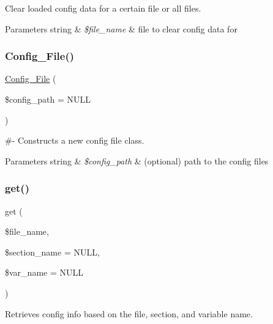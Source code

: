 Clear loaded config data for a certain file or all files.


\begin{DoxyParams}[1]{Parameters}
string & {\em \$file\+\_\+name} & file to clear config data for \\
\hline
\end{DoxyParams}
\mbox{\label{class_config___file_aca7833d633dfdb20287c9596e386790d}} 
\subsubsection{\texorpdfstring{Config\+\_\+\+File()}{Config\_File()}}
{\footnotesize\ttfamily \mbox{\hyperlink{class_config___file}{Config\+\_\+\+File}} (\begin{DoxyParamCaption}\item[{}]{\$config\+\_\+path = {\ttfamily NULL} }\end{DoxyParamCaption})}

\#-\/ Constructs a new config file class.


\begin{DoxyParams}[1]{Parameters}
string & {\em \$config\+\_\+path} & (optional) path to the config files \\
\hline
\end{DoxyParams}
\mbox{\label{class_config___file_a23679231c0a913334b147f7df83c2a77}} 
\subsubsection{\texorpdfstring{get()}{get()}}
{\footnotesize\ttfamily get (\begin{DoxyParamCaption}\item[{}]{\$file\+\_\+name,  }\item[{}]{\$section\+\_\+name = {\ttfamily NULL},  }\item[{}]{\$var\+\_\+name = {\ttfamily NULL} }\end{DoxyParamCaption})}

Retrieves config info based on the file, section, and variable name.


